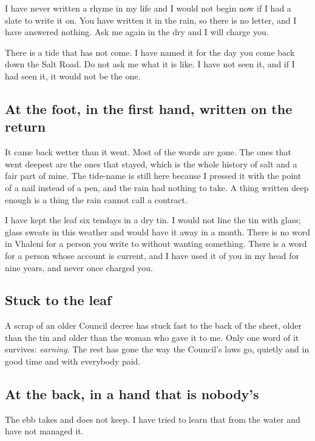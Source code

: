 \documentclass{design/chronicle}
\begin{document}
I have never written a rhyme in my life and I would not begin now if I had a slate to write it on. You have written it in the rain, so there is no letter, and I have answered nothing. Ask me again in the dry and I will charge you.

There is a tide that has not come. I have named it for the day you come back down the Salt Road. Do not ask me what it is like. I have not seen it, and if I had seen it, it would not be the one.

\subsection*{At the foot, in the first hand, written on the return}

It came back wetter than it went. Most of the words are gone. The ones that went deepest are the ones that stayed, which is the whole history of salt and a fair part of mine. The tide-name is still here because I pressed it with the point of a nail instead of a pen, and the rain had nothing to take. A thing written deep enough is a thing the rain cannot call a contract.

I have kept the leaf six tendays in a dry tin. I would not line the tin with glass; glass sweats in this weather and would have it away in a month. There is no word in Vhaleni for a person you write to without wanting something. There is a word for a person whose account is current, and I have used it of you in my head for nine years, and never once charged you.

\subsection*{Stuck to the leaf}

A scrap of an older Council decree has stuck fast to the back of the sheet, older than the tin and older than the woman who gave it to me. Only one word of it survives: \emph{earning}. The rest has gone the way the Council’s laws go, quietly and in good time and with everybody paid.

\subsection*{At the back, in a hand that is nobody’s}

The ebb takes and does not keep. I have tried to learn that from the water and have not managed it.
\end{document}
